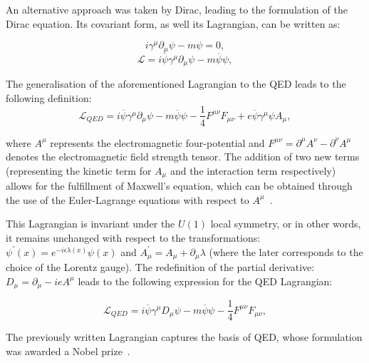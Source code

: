 \hspace{10pt} An alternative approach was taken by Dirac, leading to the formulation of the Dirac equation. Its covariant form, as well its Lagrangian, can be written as:

\begin{equation}
    i\gamma^{\mu}\partial_{\mu}\psi-m\psi = 0,
\end{equation}
\begin{equation}
\mathcal{L} = i\overline{\psi}\gamma^{\mu}\partial_{\mu}\psi  - m\overline{\psi}\psi,
\end{equation}

The generalisation of the aforementioned Lagrangian to the QED leads to the following definition:
\begin{equation}
    \mathcal{L}_{QED} = i\overline{\psi}\gamma^{\mu}\partial_{\mu}\psi  - m\overline{\psi}\psi - \frac{1}{4} F^{\mu\nu}F_{\mu\nu} + e\overline{\psi}\gamma^{\mu}\psi A_{\mu},
\end{equation}

where $A^{\mu}$ represents the electromagnetic four-potential and $F^{\mu\nu} = \partial^{\mu}A^{\nu}-\partial^{\nu}A^{\mu}$ denotes the electromagnetic field strength tensor. The addition of two new terms (representing the kinetic term for $A_{\mu}$ and the interaction term respectively) allows for the fulfillment of Maxwell's equation, which can be obtained through the use of the Euler-Lagrange equations with respect to $A^{\mu}$~\cite{book:bjorken_qed, book:bjorken_qft}.

\hspace{10pt} This Lagrangian is invariant under the $U(1)$ local symmetry, or in other words, it remains unchanged with respect to the transformations: $\psi^{'}(x) = e^{-i\epsilon\lambda(x)}\psi(x)$ and $A^{'}_{\mu} = A_{\mu} + \partial_{\mu}\lambda$ (where the later corresponds to the choice of the Lorentz gauge). The redefinition of the partial derivative: $D_{\mu} = \partial_{\mu} - ieA^{\mu}$ leads to the following expression for the QED Lagrangian:

\begin{equation}
        \mathcal{L}_{QED} = i\overline{\psi}\gamma^{\mu}D_{\mu}\psi  - m\overline{\psi}\psi - \frac{1}{4} F^{\mu\nu}F_{\mu\nu},
\end{equation}

The previously written Lagrangian captures the basis of QED, whose formulation was awarded a Nobel prize~\cite{nobel_qed}.


